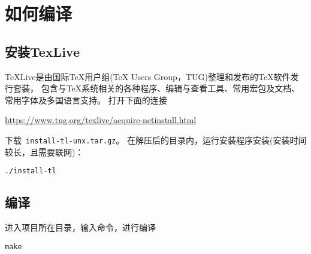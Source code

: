 \section{如何编译}
\subsection{安装TexLive}
TeXLive是由国际TeX用户组(TeX Users Group，TUG)整理和发布的TeX软件发行套装，
包含与TeX系统相关的各种程序、编辑与查看工具、常用宏包及文档、常用字体及多国语言支持。
打开下面的连接

\url{https://www.tug.org/texlive/acquire-netinstall.html}

下载~\verb+install-tl-unx.tar.gz+。
在解压后的目录内，运行安装程序安装(安装时间较长，且需要联网)：
\begin{verbatim}
./install-tl
\end{verbatim}
\subsection{编译}
进入项目所在目录，输入命令，进行编译
\begin{verbatim}
make
\end{verbatim}
